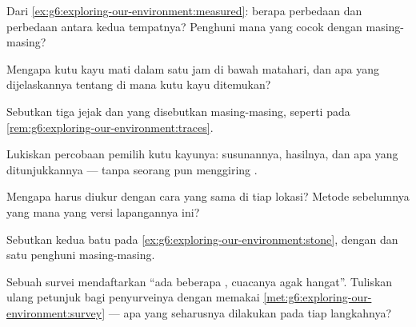 \begin{exercise}[$\star$]\label{exo:g6:exploring-our-environment:4}
Dari \cref{ex:g6:exploring-our-environment:measured}: berapa perbedaan
 dan perbedaan  antara kedua tempatnya? Penghuni mana yang
cocok dengan masing-masing?
\end{exercise}

\begin{exercise}[$\star$]\label{exo:g6:exploring-our-environment:5}
Mengapa kutu kayu mati dalam satu jam di bawah matahari, dan apa yang
dijelaskannya tentang di mana kutu kayu ditemukan?
\end{exercise}

\begin{exercise}[$\star$]\label{exo:g6:exploring-our-environment:6}
Sebutkan tiga jejak dan  yang disebutkan masing-masing, seperti
pada \cref{rem:g6:exploring-our-environment:traces}.
\end{exercise}

\begin{exercise}[$\star\star$]\label{exo:g6:exploring-our-environment:7}
Lukiskan percobaan pemilih kutu kayunya: susunannya, hasilnya, dan apa
yang ditunjukkannya --- tanpa seorang pun menggiring .
\end{exercise}

\begin{exercise}[$\star\star$]\label{exo:g6:exploring-our-environment:8}
Mengapa  harus diukur dengan cara yang sama di tiap lokasi?
Metode sebelumnya yang mana yang versi lapangannya ini?
\end{exercise}

\begin{exercise}[$\star\star$]\label{exo:g6:exploring-our-environment:9}
Sebutkan kedua  batu pada
\cref{ex:g6:exploring-our-environment:stone}, dengan  dan
satu penghuni masing-masing.
\end{exercise}

\begin{exercise}[$\star\star$]\label{exo:g6:exploring-our-environment:10}
Sebuah survei mendaftarkan ``ada beberapa , cuacanya
agak hangat''. Tuliskan ulang petunjuk bagi penyurveinya dengan
memakai \cref{met:g6:exploring-our-environment:survey} --- apa yang
seharusnya dilakukan pada tiap langkahnya?
\end{exercise}

